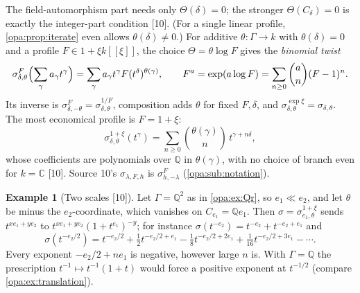\documentclass[11pt,oneside]{article}
\numberwithin{equation}{section}
\theoremstyle{definition}
\newtheorem{example}[example]{Example}
\theoremstyle{remark}
\newcommand{\C}{\mathbb C}
\newcommand{\Q}{\mathbb Q}
\newcommand{\bb}{\mathbin{\ll}}
\newcommand{\src}[1]{\textup{\textsf{\small[#1]}}}
\begin{document}
The field-automorphism part needs only $\Theta(\delta)=0$; the stronger
$\Theta(C_\delta)=0$ is exactly the integer-part condition \src{10}. (For a single
linear profile, \cref{opa:prop:iterate} even allows $\theta(\delta)\ne0$.)
For additive $\theta:\Gamma\to k$ with $\theta(\delta)=0$ and a profile
$F\in1+\xi k[[\xi]]$, the choice $\Theta=\theta\log F$ gives the \emph{binomial
twist}
\begin{equation}\label{opa:sc:eq:binomial}
 \sigma^F_{\delta,\theta}\Bigl(\sum_\gamma a_\gamma t^\gamma\Bigr)
 =\sum_\gamma a_\gamma t^\gamma F(t^\delta)^{\theta(\gamma)},\qquad
 F^a=\exp(a\log F)=\sum_{n\ge0}\binom an(F-1)^n .
\end{equation}
Its inverse is $\sigma^F_{\delta,-\theta}=\sigma^{1/F}_{\delta,\theta}$, composition
adds $\theta$ for fixed $F,\delta$, and $\sigma^{\exp\xi}_{\delta,\theta}=\sigma_{\delta,\theta}$.
The most economical profile is $F=1+\xi$:
\begin{equation}\label{opa:sc:eq:binomialone}
 \sigma^{1+\xi}_{\delta,\theta}(t^\gamma)=\sum_{n\ge0}\binom{\theta(\gamma)}n\,t^{\gamma+n\delta},
\end{equation}
whose coefficients are polynomials over $\Q$ in $\theta(\gamma)$, with no choice of
branch even for $k=\C$ \src{10}. Source 10's $\sigma_{\lambda,F,h}$ is
$\sigma^F_{h,-\lambda}$ (\cref{opa:sub:notation}).

\begin{example}[Two scales \src{10}]\label{opa:sc:ex:ranktwo}
Let $\Gamma=\Q^2$ as in \cref{opa:ex:Qr}, so $e_1\bb e_2$, and let $\theta$ be minus
the $e_2$-coordinate, which vanishes on $C_{e_1}=\Q e_1$. Then
$\sigma=\sigma^{1+\xi}_{e_1,\theta}$ sends $t^{xe_1+ye_2}$ to
$t^{xe_1+ye_2}(1+t^{e_1})^{-y}$; for instance $\sigma(t^{-e_2})=t^{-e_2}+t^{-e_2+e_1}$ and
\[
 \sigma(t^{-e_2/2})=t^{-e_2/2}+\tfrac12t^{-e_2/2+e_1}-\tfrac18t^{-e_2/2+2e_1}
 +\tfrac1{16}t^{-e_2/2+3e_1}-\cdots .
\]
Every exponent $-e_2/2+ne_1$ is negative, however large $n$ is. With $\Gamma=\Q$ the
prescription $t^{-1}\mapsto t^{-1}(1+t)$ would force a positive exponent at
$t^{-1/2}$ (compare \cref{opa:ex:translation}).
\end{example}
\end{document}
